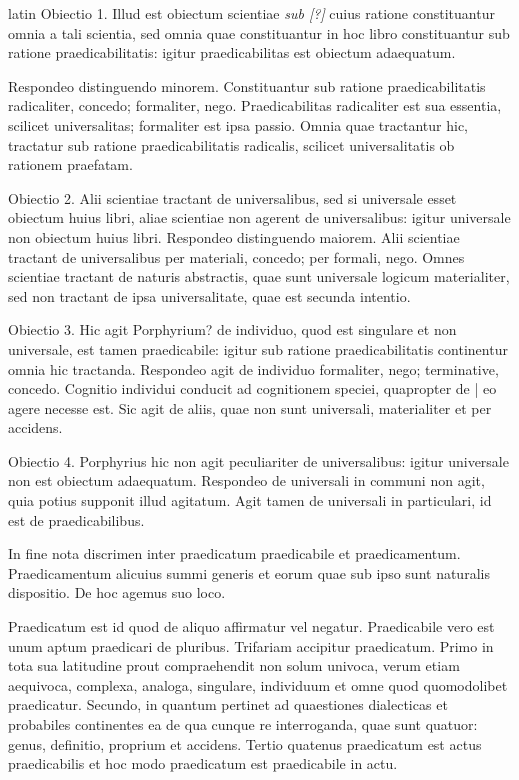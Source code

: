 \begin{otherlanguage*}{latin}
\pstart
  Obiectio 1. Illud est obiectum scientiae \emph{sub [?]} cuius ratione constituantur omnia a tali scientia, sed omnia quae constituantur in hoc libro constituantur sub ratione praedicabilitatis: igitur praedicabilitas est obiectum adaequatum. 
\pend

\pstart
  Respondeo distinguendo minorem. Constituantur sub ratione praedicabilitatis radicaliter, concedo; formaliter, nego. Praedicabilitas radicaliter est sua essentia, scilicet universalitas; formaliter est ipsa passio. Omnia quae tractantur hic, tractatur sub ratione praedicabilitatis radicalis, scilicet universalitatis ob rationem praefatam. 
\pend

\pstart
  Obiectio 2. Alii scientiae tractant de universalibus, sed si universale esset obiectum huius libri, aliae scientiae non agerent de universalibus: igitur universale non obiectum huius libri. Respondeo distinguendo maiorem. Alii scientiae tractant de universalibus per materiali, concedo; per formali, nego. Omnes scientiae tractant de naturis abstractis, quae sunt universale logicum materialiter, sed non tractant de ipsa universalitate, quae est secunda intentio. 
\pend

\pstart
  Obiectio 3. Hic agit Porphyrium? de individuo, quod est singulare et non universale, est tamen praedicabile: igitur sub ratione praedicabilitatis continentur omnia hic tractanda. Respondeo agit de individuo formaliter, nego; terminative, concedo. Cognitio individui conducit ad cognitionem speciei, quapropter de \textnormal{|} eo agere necesse est. Sic agit de aliis, quae non sunt universali, materialiter et per accidens. 
\pend

\pstart
  Obiectio 4. Porphyrius hic non agit peculiariter de universalibus: igitur universale non est obiectum adaequatum. Respondeo de universali in communi non agit, quia potius supponit illud agitatum. Agit tamen de universali in particulari, id est de praedicabilibus. 
\pend

\pstart
  In fine nota discrimen inter praedicatum praedicabile et praedicamentum. Praedicamentum alicuius summi generis et eorum quae sub ipso sunt naturalis dispositio. De hoc agemus suo loco. 
\pend

\pstart
  Praedicatum est id quod de aliquo affirmatur vel negatur. Praedicabile vero est unum aptum praedicari de pluribus. Trifariam accipitur praedicatum. Primo in tota sua latitudine prout compraehendit non solum univoca, verum etiam aequivoca, complexa, analoga, singulare, individuum et omne quod quomodolibet praedicatur. Secundo, in quantum pertinet ad quaestiones dialecticas et probabiles continentes ea de qua cunque re interroganda, quae sunt quatuor: genus, definitio, proprium et accidens. Tertio quatenus praedicatum est actus praedicabilis et hoc modo praedicatum est praedicabile in actu. 
\pend


\end{otherlanguage*}
